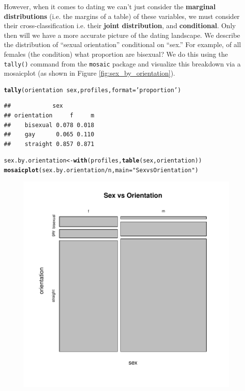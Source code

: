 \documentclass{article}\usepackage[]{graphicx}\usepackage[]{color}
\makeatletter
\def\maxwidth{ %
  \ifdim\Gin@nat@width>\linewidth
    \linewidth
  \else
    \Gin@nat@width
  \fi
}
\newcommand{\hlstr}[1]{\textcolor[rgb]{0.192,0.494,0.8}{#1}}%
\newcommand{\hlopt}[1]{\textcolor[rgb]{0,0,0}{#1}}%
\newcommand{\hlstd}[1]{\textcolor[rgb]{0.345,0.345,0.345}{#1}}%
\newcommand{\hlkwb}[1]{\textcolor[rgb]{0.69,0.353,0.396}{#1}}%
\newcommand{\hlkwc}[1]{\textcolor[rgb]{0.333,0.667,0.333}{#1}}%
\newcommand{\hlkwd}[1]{\textcolor[rgb]{0.737,0.353,0.396}{\textbf{#1}}}%
\newenvironment{kframe}{%
 \def\at@end@of@kframe{}%
 \ifinner\ifhmode%
  \def\at@end@of@kframe{\end{minipage}}%
  \begin{minipage}{\columnwidth}%
 \fi\fi%
 \def\FrameCommand##1{\hskip\@totalleftmargin \hskip-\fboxsep
 \colorbox{shadecolor}{##1}\hskip-\fboxsep
     \hskip-\linewidth \hskip-\@totalleftmargin \hskip\columnwidth}%
 \MakeFramed {\advance\hsize-\width
   \@totalleftmargin\z@ \linewidth\hsize
   \@setminipage}}%
 {\par\unskip\endMakeFramed%
 \at@end@of@kframe}
\newenvironment{knitrout}{}{} %
\makeatother
\begin{document}
However, when it comes to dating we can't just consider the \textbf{marginal distributions} (i.e. the margins of a table) of these variables, we must consider their cross-classification i.e. their \textbf{joint distribution}, and \textbf{conditional}.  Only then will we have a more accurate picture of the dating landscape.  We describe the distribution of ``sexual orientation'' conditional on ``sex.''  For example, of all females (the condition) what proportion are bisexual?  We do this using the \verb#tally()# command from the \verb#mosaic# package and visualize this breakdown via a mosaicplot (as shown in Figure \ref{fig:sex_by_orientation}).

\begin{knitrout}
\color{fgcolor}\begin{kframe}
\begin{alltt}
\hlkwd{tally}\hlstd{(orientation} \hlopt{~} \hlstd{sex, profiles,} \hlkwc{format}\hlstd{=}\hlstr{'proportion'}\hlstd{)}
\end{alltt}
\begin{verbatim}
##            sex
## orientation     f     m
##    bisexual 0.078 0.018
##    gay      0.065 0.110
##    straight 0.857 0.871
\end{verbatim}
\begin{alltt}
\hlstd{sex.by.orientation} \hlkwb{<-} \hlkwd{with}\hlstd{(profiles,} \hlkwd{table}\hlstd{(sex, orientation))}
\hlkwd{mosaicplot}\hlstd{(sex.by.orientation}\hlopt{/}\hlstd{n,} \hlkwc{main}\hlstd{=}\hlstr{"Sex vs Orientation"}\hlstd{)}
\end{alltt}
\end{kframe}\begin{figure}

{\centering \includegraphics[width=\maxwidth]{figure/sex_by_orientation-1} 

}
\end{figure}
\end{knitrout}
\end{document}

